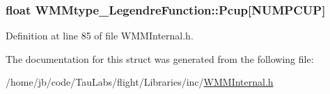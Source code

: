 \hypertarget{struct_w_m_mtype___legendre_function_a3059147ef5db575cff502086ffd6181e}{
\subsubsection[{\-Pcup}]{\setlength{\rightskip}{0pt plus 5cm}float {\bf \-W\-M\-Mtype\-\_\-\-Legendre\-Function\-::\-Pcup}\mbox{[}\-N\-U\-M\-P\-C\-U\-P\mbox{]}}}\label{struct_w_m_mtype___legendre_function_a3059147ef5db575cff502086ffd6181e}


\-Definition at line 85 of file \-W\-M\-M\-Internal.\-h.



\-The documentation for this struct was generated from the following file\-:\begin{DoxyCompactItemize}
\item 
/home/jb/code/\-Tau\-Labs/flight/\-Libraries/inc/\hyperlink{_w_m_m_internal_8h}{\-W\-M\-M\-Internal.\-h}\end{DoxyCompactItemize}
